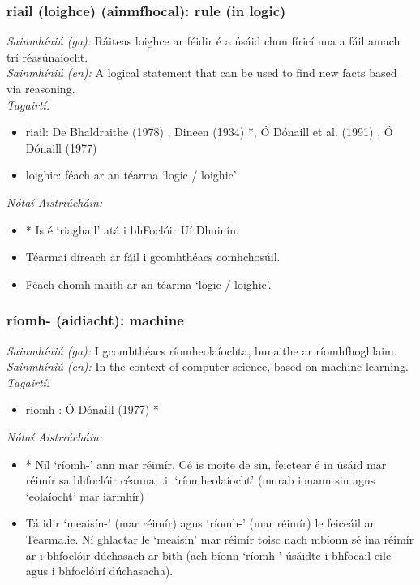 \subsubsection*{riail (loighce) (ainmfhocal): rule (in logic)}
 \noindent \textit{Sainmhíniú (ga):} Ráiteas loighce ar féidir é a úsáid chun fíricí nua a fáil amach trí réasúnaíocht.
\\
 \noindent \textit{Sainmhíniú (en):} A logical statement that can be used to find new facts based via reasoning.
\\
 \noindent \textit{Tagairtí:}
\begin{itemize}
	\item riail: De Bhaldraithe (1978) \cite{de-bhaldraithe}, Dineen (1934) \cite{dineen}*, Ó Dónaill et al. (1991) \cite{focloir-beag}, Ó Dónaill (1977) \cite{odonaill}
	\item loighic: féach ar an téarma `logic / loighic'
\end{itemize}

 \noindent \textit{Nótaí Aistriúcháin:}
\begin{itemize}
	\item * Is é `riaghail' atá i bhFoclóir Uí Dhuinín.
	\item Téarmaí díreach ar fáil i gcomhthéacs comhchosúil.
	\item Féach chomh maith ar an téarma `logic / loighic'.
\end{itemize}


\subsubsection*{ríomh- (aidiacht): machine}
 \noindent \textit{Sainmhíniú (ga):} I gcomhthéacs ríomheolaíochta, bunaithe ar ríomhfhoghlaim.
\\
 \noindent \textit{Sainmhíniú (en):} In the context of computer science, based on machine learning.
\\
 \noindent \textit{Tagairtí:}
\begin{itemize}
	\item ríomh-: Ó Dónaill (1977) \cite{odonaill}*
\end{itemize}

 \noindent \textit{Nótaí Aistriúcháin:}
\begin{itemize}
	\item * Níl `ríomh-' ann mar réimír. Cé is moite de sin, feictear é in úsáid mar réimír sa bhfoclóir céanna; .i. `ríomheolaíocht' (murab ionann sin agus `eolaíocht' mar iarmhír)
	\item Tá idir `meaisín-' (mar réimír) agus `ríomh-' (mar réimír) le feiceáil ar Téarma.ie. Ní ghlactar le `meaisín' mar réimír toisc nach mbíonn sé ina réimír ar i bhfoclóir dúchasach ar bith (ach bíonn `ríomh-' úsáidte i bhfocail eile agus i bhfoclóirí dúchasacha).
\end{itemize}


